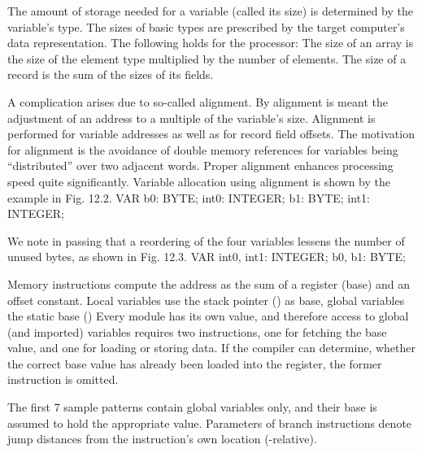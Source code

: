 The amount of storage needed for a variable (called its size) is determined by the variable's type. The sizes of basic types are prescribed by the target computer's data representation. The following holds for the \RISC processor:
\medskip
{}\medskip
\noindent The size of an array is the size of the element type multiplied by the number of elements. The size of a record is the sum of the sizes of its fields.

A complication arises due to so-called alignment. By alignment is meant the adjustment of an address to a multiple of the variable's size. Alignment is performed for variable addresses as well as for record field offsets. The motivation for alignment is the avoidance of double memory references for variables being ``distributed'' over two adjacent words. Proper alignment enhances processing speed quite significantly. Variable allocation using alignment is shown by the example in Fig. 12.2.
\begintt
VAR b0: BYTE; int0: INTEGER; b1: BYTE; int1: INTEGER;
\endtt


\noindent We note in passing that a reordering of the four variables lessens the number of unused bytes, as shown in Fig. 12.3.
\begintt
VAR int0, int1: INTEGER; b0, b1: BYTE;
\endtt


Memory instructions compute the address as the sum of a register (base) and an offset constant. Local variables use the stack pointer  () as base, global variables the static base  () Every module has its own  value, and therefore access to global (and imported) variables requires two instructions, one for fetching the base value, and one for loading or storing data. If the compiler can determine, whether the correct base value has already been loaded into the  register, the former instruction is omitted.

The first 7 sample patterns contain global variables only, and their base  is assumed to hold the appropriate value. Parameters of branch instructions denote jump distances from the instruction's own location (-relative).

